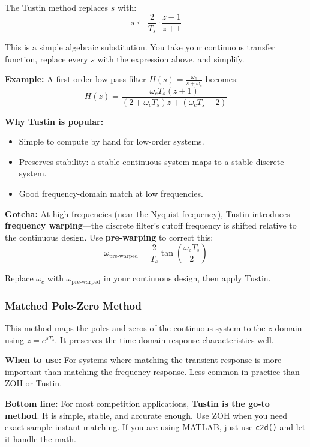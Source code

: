 The Tustin method replaces $s$ with:
\begin{equation}
s \leftarrow \frac{2}{T_s} \cdot \frac{z - 1}{z + 1}
\end{equation}

This is a simple algebraic substitution. You take your continuous transfer function, replace every $s$ with the expression above, and simplify.

\textbf{Example:} A first-order low-pass filter $H(s) = \frac{\omega_c}{s + \omega_c}$ becomes:
\begin{equation}
H(z) = \frac{\omega_c T_s (z + 1)}{(2 + \omega_c T_s) z + (\omega_c T_s - 2)}
\end{equation}

\textbf{Why Tustin is popular:}
\begin{itemize}
    \item Simple to compute by hand for low-order systems.
    \item Preserves stability: a stable continuous system maps to a stable discrete system.
    \item Good frequency-domain match at low frequencies.
\end{itemize}

\textbf{Gotcha:} At high frequencies (near the Nyquist frequency), Tustin introduces \textbf{frequency warping}---the discrete filter's cutoff frequency is shifted relative to the continuous design. Use \textbf{pre-warping} to correct this:
\begin{equation}
\omega_{\text{pre-warped}} = \frac{2}{T_s} \tan\left(\frac{\omega_c T_s}{2}\right)
\end{equation}

Replace $\omega_c$ with $\omega_{\text{pre-warped}}$ in your continuous design, then apply Tustin.

\subsubsection{Matched Pole-Zero Method}

This method maps the poles and zeros of the continuous system to the $z$-domain using $z = e^{sT_s}$. It preserves the time-domain response characteristics well.

\textbf{When to use:} For systems where matching the transient response is more important than matching the frequency response. Less common in practice than ZOH or Tustin.

\textbf{Bottom line:} For most competition applications, \textbf{Tustin is the go-to method}. It is simple, stable, and accurate enough. Use ZOH when you need exact sample-instant matching. If you are using MATLAB, just use \texttt{c2d()} and let it handle the math.

